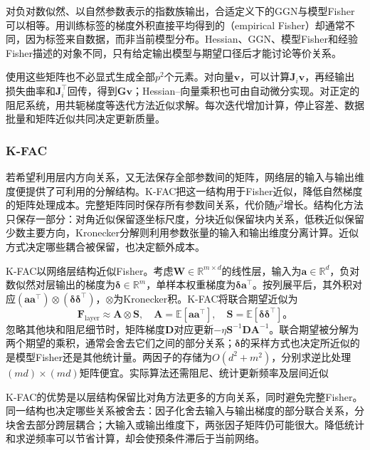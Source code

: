 对负对数似然、以自然参数表示的指数族输出，合适定义下的GGN与模型Fisher可以相等。用训练标签的梯度外积直接平均得到的（empirical Fisher）却通常不同，因为标签来自数据，而非当前模型分布。Hessian、GGN、模型Fisher和经验Fisher描述的对象不同，只有给定输出模型与期望口径后才能讨论等价关系。

使用这些矩阵也不必显式生成全部$p^2$个元素。对向量$\bm v$，可以计算$\bm J_i\bm v$，再经输出损失曲率和$\bm J_i^{\top}$回传，得到$\bm G\bm v$；Hessian--向量乘积也可由自动微分实现。对正定的阻尼系统，用共轭梯度等迭代方法近似求解。每次迭代增加计算，停止容差、数据批量和矩阵近似共同决定更新质量。

\subsubsection{K-FAC}
\label{sec:training-structured-preconditioning}

若希望利用层内方向关系，又无法保存全部参数间的矩阵，网络层的输入与输出维度便提供了可利用的分解结构。K-FAC把这一结构用于Fisher近似，降低自然梯度的矩阵处理成本。完整矩阵同时保存所有参数间关系，代价随$p^2$增长。结构化方法只保存一部分：对角近似保留逐坐标尺度，分块近似保留块内关系，低秩近似保留少数主要方向，Kronecker分解则利用参数张量的输入和输出维度分离计算。近似方式决定哪些耦合被保留，也决定额外成本。

K-FAC以网络层结构近似Fisher。考虑$\bm W\in\mathbb R^{m\times d}$的线性层，输入为$\bm a\in\mathbb R^d$，负对数似然对层输出的梯度为$\bm\delta\in\mathbb R^m$，单样本权重梯度为$\bm\delta\bm a^{\top}$。按列展平后，其外积对应$(\bm a\bm a^{\top})\otimes(\bm\delta\bm\delta^{\top})$，$\otimes$为Kronecker积。K-FAC将联合期望近似为
\begin{equation}
  \bm F_{\mathrm{layer}}\approx\bm A\otimes\bm S,
  \quad\bm A=\mathbb E[\bm a\bm a^{\top}],\quad
  \bm S=\mathbb E[\bm\delta\bm\delta^{\top}]\text{。}
  \label{eq:training-kfac}
\end{equation}
忽略其他块和阻尼细节时，矩阵梯度$\bm D$对应更新$-\eta\bm S^{-1}\bm D\bm A^{-1}$。联合期望被分解为两个期望的乘积，通常会舍去它们之间的部分关系；$\bm\delta$的采样方式也决定所近似的是模型Fisher还是其他统计量。两因子的存储为$O(d^2+m^2)$，分别求逆比处理$(md)\times(md)$矩阵便宜。实际算法还需阻尼、统计更新频率及层间近似

K-FAC的优势是以层结构保留比对角方法更多的方向关系，同时避免完整Fisher。同一结构也决定哪些关系被舍去：因子化舍去输入与输出梯度的部分联合关系，分块舍去部分跨层耦合；大输入或输出维度下，两张因子矩阵仍可能很大。降低统计和求逆频率可以节省计算，却会使预条件滞后于当前网络。

